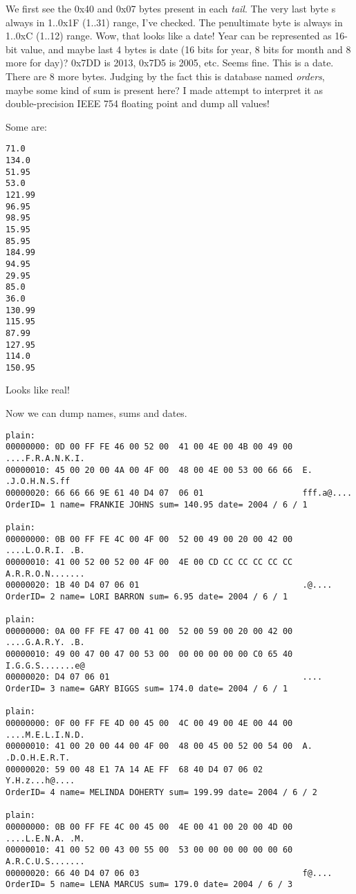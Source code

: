 We first see the 0x40 and 0x07 bytes present in each \emph{tail}.
The very last byte s always in 1..0x1F (1..31) range, I've checked.
The penultimate byte is always in 1..0xC (1..12) range.
Wow, that looks like a date!
Year can be represented as 16-bit value, and maybe last 4 bytes is date (16 bits for year, 8 bits
for month and 8 more for day)?
0x7DD is 2013, 0x7D5 is 2005, etc. Seems fine. This is a date.
There are 8 more bytes.
Judging by the fact this is database named \emph{orders}, maybe some kind of sum is present here?
I made attempt to interpret it as double-precision IEEE 754 floating point and dump all values!

Some are:

\begin{lstlisting}
71.0
134.0
51.95
53.0
121.99
96.95
98.95
15.95
85.95
184.99
94.95
29.95
85.0
36.0
130.99
115.95
87.99
127.95
114.0
150.95
\end{lstlisting}

Looks like real!

Now we can dump names, sums and dates.

\begin{lstlisting}
plain:
00000000: 0D 00 FF FE 46 00 52 00  41 00 4E 00 4B 00 49 00  ....F.R.A.N.K.I.
00000010: 45 00 20 00 4A 00 4F 00  48 00 4E 00 53 00 66 66  E. .J.O.H.N.S.ff
00000020: 66 66 66 9E 61 40 D4 07  06 01                    fff.a@....
OrderID= 1 name= FRANKIE JOHNS sum= 140.95 date= 2004 / 6 / 1

plain:
00000000: 0B 00 FF FE 4C 00 4F 00  52 00 49 00 20 00 42 00  ....L.O.R.I. .B.
00000010: 41 00 52 00 52 00 4F 00  4E 00 CD CC CC CC CC CC  A.R.R.O.N.......
00000020: 1B 40 D4 07 06 01                                 .@....
OrderID= 2 name= LORI BARRON sum= 6.95 date= 2004 / 6 / 1

plain:
00000000: 0A 00 FF FE 47 00 41 00  52 00 59 00 20 00 42 00  ....G.A.R.Y. .B.
00000010: 49 00 47 00 47 00 53 00  00 00 00 00 00 C0 65 40  I.G.G.S.......e@
00000020: D4 07 06 01                                       ....
OrderID= 3 name= GARY BIGGS sum= 174.0 date= 2004 / 6 / 1

plain:
00000000: 0F 00 FF FE 4D 00 45 00  4C 00 49 00 4E 00 44 00  ....M.E.L.I.N.D.
00000010: 41 00 20 00 44 00 4F 00  48 00 45 00 52 00 54 00  A. .D.O.H.E.R.T.
00000020: 59 00 48 E1 7A 14 AE FF  68 40 D4 07 06 02        Y.H.z...h@....
OrderID= 4 name= MELINDA DOHERTY sum= 199.99 date= 2004 / 6 / 2

plain:
00000000: 0B 00 FF FE 4C 00 45 00  4E 00 41 00 20 00 4D 00  ....L.E.N.A. .M.
00000010: 41 00 52 00 43 00 55 00  53 00 00 00 00 00 00 60  A.R.C.U.S.......
00000020: 66 40 D4 07 06 03                                 f@....
OrderID= 5 name= LENA MARCUS sum= 179.0 date= 2004 / 6 / 3
\end{lstlisting}

